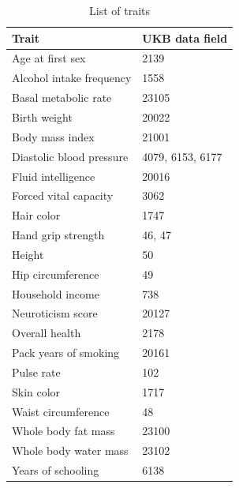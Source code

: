 \documentclass[hidelinks, 12pt]{article}
\begin{document}
\begin{table}[h!]
\caption{List of traits}
\begin{center}
 \begin{tabular}{| l l |} 
 \hline
 \textbf{Trait} & \textbf{UKB data field} \\ [0.5ex] 
 \hline\hline
  Age at first sex & 2139  \\ 
  Alcohol intake frequency & 1558  \\
  Basal metabolic rate & 23105  \\ 
  Birth weight & 20022  \\ 
  Body mass index & 21001  \\
  Diastolic blood pressure & 4079, 6153, 6177  \\ 
  Fluid intelligence & 20016  \\ 
  Forced vital capacity & 3062  \\ 
  Hair color & 1747  \\ 
  Hand grip strength & 46, 47  \\ 
  Height & 50  \\ 
  Hip circumference & 49  \\ 
  Household income & 738  \\ 
  Neuroticism score & 20127  \\ 
  Overall health & 2178  \\ 
  Pack years of smoking & 20161  \\ 
  Pulse rate & 102  \\ 
  Skin color & 1717  \\ 
  Waist circumference & 48  \\ 
  Whole body fat mass & 23100  \\ 
  Whole body water mass & 23102  \\ 
  Years of schooling & 6138 \\ 
   \hline
 \end{tabular}
\end{center}
\end{table}
\end{document}

